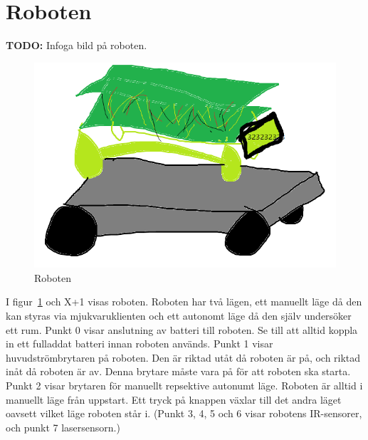 \documentclass{article}
\begin{document}
\section{Roboten}
\textbf{TODO:} Infoga bild på roboten.
\begin{figure}[H]
\centering
\includegraphics[scale=0.5]{robot}
\caption{Roboten}
\label{fig:robot}
\end{figure}
I figur~\ref{fig:robot} och X+1 visas roboten. Roboten har två lägen, ett manuellt läge då den kan styras via mjukvaruklienten och ett autonomt läge då den själv undersöker ett rum. 
Punkt 0 visar anslutning av batteri till roboten. Se till att alltid koppla in ett fulladdat batteri innan roboten används. Punkt 1 visar huvudströmbrytaren på roboten. Den är riktad utåt då roboten är på, och riktad inåt då roboten är av. Denna brytare måste vara på för att roboten ska starta. Punkt 2 visar brytaren för manuellt repsektive autonumt läge. Roboten är alltid i manuellt läge från uppstart. Ett tryck på knappen växlar till det andra läget oavsett vilket läge roboten står i. (Punkt 3, 4, 5 och 6 visar robotens IR-sensorer, och punkt 7 lasersensorn.)
\end{document}
